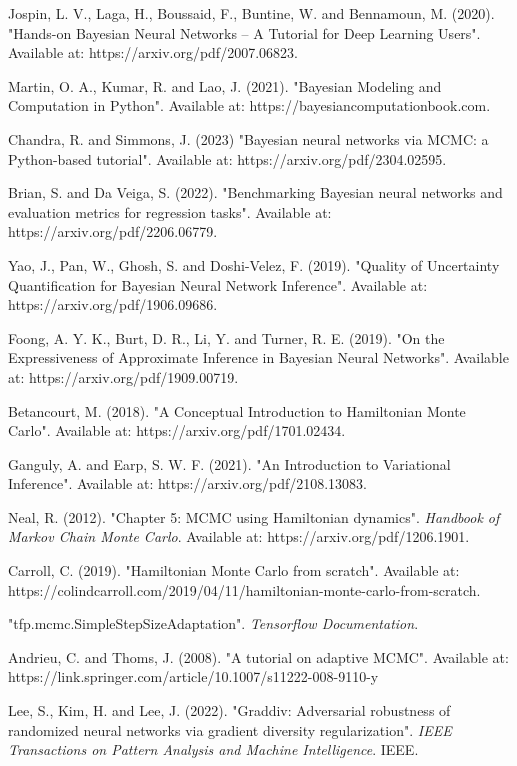 \documentclass[conference]{IEEEtran}
\begin{document}
\begin{thebibliography}{00}

 Jospin, L. V., Laga, H., Boussaid, F., Buntine, W. and Bennamoun, M. (2020). "Hands-on Bayesian Neural Networks – A Tutorial for Deep Learning Users". Available at: https://arxiv.org/pdf/2007.06823.

 Martin, O. A., Kumar, R. and Lao, J. (2021). "Bayesian Modeling and Computation in Python". Available at: https://bayesiancomputationbook.com.

 Chandra, R. and Simmons, J. (2023) "Bayesian neural networks via MCMC: a Python-based tutorial". Available at: https://arxiv.org/pdf/2304.02595.

 Brian, S. and Da Veiga, S. (2022). "Benchmarking Bayesian neural networks and evaluation metrics for regression tasks". Available at: https://arxiv.org/pdf/2206.06779.

 Yao, J., Pan, W., Ghosh, S. and Doshi-Velez, F. (2019). "Quality of Uncertainty Quantification for Bayesian Neural Network Inference". Available at: https://arxiv.org/pdf/1906.09686.

 Foong, A. Y. K., Burt, D. R., Li, Y. and Turner, R. E. (2019). "On the Expressiveness of Approximate Inference in Bayesian Neural Networks". Available at: https://arxiv.org/pdf/1909.00719.

 Betancourt, M. (2018). "A Conceptual Introduction to Hamiltonian Monte Carlo". Available at: https://arxiv.org/pdf/1701.02434.

 Ganguly, A. and Earp, S. W. F. (2021). "An Introduction to Variational Inference". Available at: https://arxiv.org/pdf/2108.13083.

 Neal, R. (2012). "Chapter 5: MCMC using Hamiltonian dynamics". \textit{Handbook of Markov Chain Monte Carlo}. Available at: https://arxiv.org/pdf/1206.1901.

 Carroll, C. (2019). "Hamiltonian Monte Carlo from scratch". Available at: https://colindcarroll.com/2019/04/11/hamiltonian-monte-carlo-from-scratch.

 "tfp.mcmc.SimpleStepSizeAdaptation". \textit{Tensorflow Documentation}.

 Andrieu, C. and Thoms, J. (2008). "A tutorial on adaptive MCMC". Available at: https://link.springer.com/article/10.1007/s11222-008-9110-y

\bibitem Lee, S., Kim, H. and Lee, J. (2022). "Graddiv: Adversarial robustness of randomized neural networks via gradient diversity regularization". \textit{IEEE Transactions on Pattern Analysis and Machine Intelligence}. IEEE.

\end{thebibliography}
\vspace{12pt}
\end{document}
